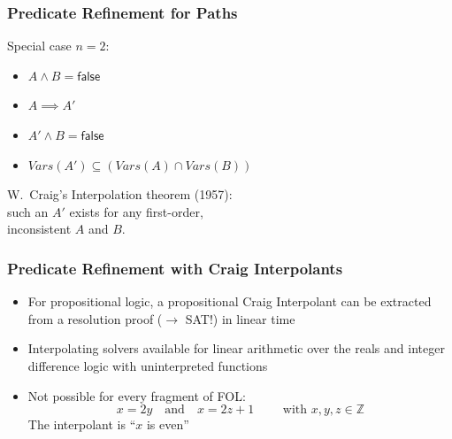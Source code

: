 \begin{frame}
\frametitle{Predicate Refinement for Paths}

Special case $n=2$:

\begin{itemize}
\item $A \land B = \textsf{false}$
\item $A \implies A'$
\item $A' \land B = \textsf{false}$
\item $\mathit{Vars}(A') \subseteq
(\mathit{Vars}(A)\cap\mathit{Vars}(B))$
\end{itemize}
\vfill

\pause
\begin{center}
\colorbox{tabutter!30}{\begin{minipage}{.7\textwidth}
\alert{W.~Craig's Interpolation theorem} (1957):\\
such an $A'$ exists for any first-order,\\
inconsistent $A$ and $B$.
\end{minipage}}
\end{center}

\end{frame}


\begin{frame}
\frametitle{Predicate Refinement with Craig Interpolants}

\begin{itemize}

\item[\mycheck] For propositional logic, a propositional Craig Interpolant
can be extracted from a resolution proof ($\rightarrow$ SAT!)
in linear time
\vfill

\item[\mycheck] Interpolating solvers available for {\color{ta3skyblue}linear
arithmetic over the reals} and {\color{ta3skyblue}integer difference logic}
with uninterpreted functions
\vfill

\item[\myfail] Not possible for every fragment of FOL:
\[ x = 2y \quad\mbox{and}\quad x=2z+1 \qquad\mbox{ with } x,y,z \in \mathds{Z}\]
\pause
%
The interpolant is ``$x$ is even''

\end{itemize}

\end{frame}

